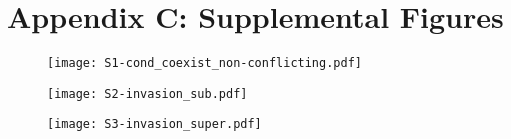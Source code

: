 \section*{Appendix C: Supplemental Figures}

\renewcommand{\thefigure}{C\arabic{figure}}
\renewcommand{\theequation}{C\arabic{equation}}
\renewcommand{\thetable}{C\arabic{table}}
\setcounter{equation}{0}
\setcounter{figure}{0}
\setcounter{table}{0}



\begin{figure}[ht!]
\centering
\texttt{[image: S1-cond\_coexist\_non-conflicting.pdf]}
\caption{}
\label{fig:cond-coexist-non-conflicting}
\end{figure}



\begin{figure}[ht!]
\centering
\texttt{[image: S2-invasion\_sub.pdf]}
\caption{}
\label{fig:invasion-sub}
\end{figure}


\begin{figure}[ht!]
\centering
\texttt{[image: S3-invasion\_super.pdf]}
\caption{}
\label{fig:invasion-super}
\end{figure}

